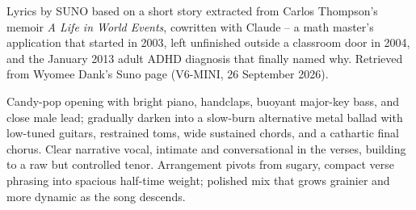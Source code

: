 
\begin{notes}
Lyrics by SUNO based on a short story extracted from Carlos Thompson's memoir \emph{A Life in World Events}, cowritten with Claude -- a math master's application that started in 2003, left unfinished outside a classroom door in 2004, and the January 2013 adult ADHD diagnosis that finally named why. Retrieved from Wyomee Dank's Suno page (V6-MINI, 26 September 2026).
\end{notes}
\begin{style}
Candy-pop opening with bright piano, handclaps, buoyant major-key bass, and close male lead; gradually darken into a slow-burn alternative metal ballad with low-tuned guitars, restrained toms, wide sustained chords, and a cathartic final chorus. Clear narrative vocal, intimate and conversational in the verses, building to a raw but controlled tenor. Arrangement pivots from sugary, compact verse phrasing into spacious half-time weight; polished mix that grows grainier and more dynamic as the song descends.
\end{style}

